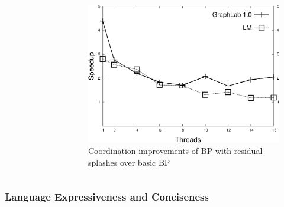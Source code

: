 \documentclass{beamer}
\begin{document}
\begin{frame}[fragile]
\begin{columns}
\begin{figure}[b]
      \end{figure}
      \begin{figure}[b]
         \includegraphics[width=\textwidth]{coord/improv_bp-graphlab-400.pdf}
         \caption{Coordination improvements of BP with residual splashes over basic BP}
      \end{figure}
   \end{columns}
\end{frame}

\begin{frame}[fragile]
   \frametitle{Language Expressiveness and Conciseness}
   \begin{table}[ht]
   \begin{center}
   \end{center}
        \caption{Comparison of source code size against other languages.}
   \end{table}
\end{frame}
\end{document}
